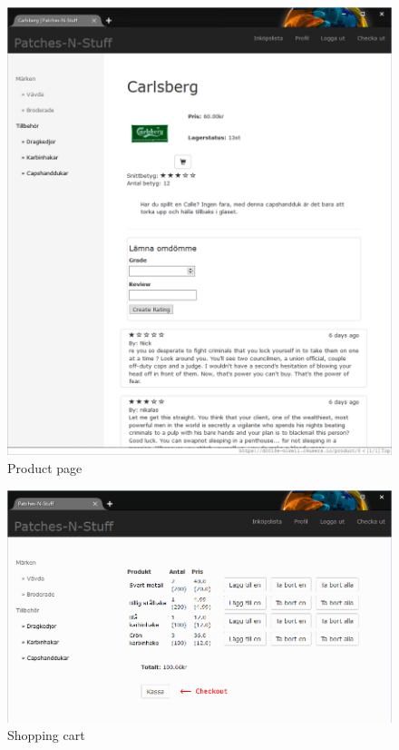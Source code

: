 \documentclass[paper=a4, fontsize=11pt]{report} %
\begin{document}
\begin{itemize}
\begin{figure}
	\includegraphics[width=0.9\paperwidth]{artifacts/stories/8_product.png}
	\caption{Product page}
	\label{fig:product}
\end{figure}

\begin{figure}
	\includegraphics[width=0.9\paperwidth]{artifacts/stories/9_cart.png}
	\caption{Shopping cart}
	\label{fig:cart}
\end{figure}


\end{itemize}
\end{document}
